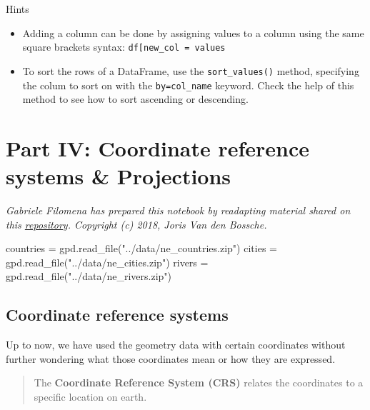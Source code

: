 \documentclass[
  letterpaper,
  DIV=11,
  numbers=noendperiod]{scrreprt}
\newenvironment{Shaded}{\begin{snugshade}}{\end{snugshade}}
\newcommand{\NormalTok}[1]{\textcolor[rgb]{0.00,0.23,0.31}{#1}}
\newcommand{\OperatorTok}[1]{\textcolor[rgb]{0.37,0.37,0.37}{#1}}
\newcommand{\StringTok}[1]{\textcolor[rgb]{0.13,0.47,0.30}{#1}}
\providecommand{\tightlist}{%
  \setlength{\itemsep}{0pt}\setlength{\parskip}{0pt}}\usepackage{longtable,booktabs,array}
\begin{document}
Hints

\begin{itemize}
\tightlist
\item
  Adding a column can be done by assigning values to a column using the
  same square brackets syntax:
  \texttt{df{[}\textquotesingle{}new\_col\textquotesingle{}{]}\ =\ values}
\item
  To sort the rows of a DataFrame, use the \texttt{sort\_values()}
  method, specifying the colum to sort on with the
  \texttt{by=\textquotesingle{}col\_name\textquotesingle{}} keyword.
  Check the help of this method to see how to sort ascending or
  descending.
\end{itemize}

\hypertarget{part-iv-coordinate-reference-systems-projections}{%
\section{Part IV: Coordinate reference systems \&
Projections}\label{part-iv-coordinate-reference-systems-projections}}

\emph{Gabriele Filomena has prepared this notebook by readapting
material shared on this
\href{https://github.com/jorisvandenbossche/geopandas-tutorial}{repository}.
Copyright (c) 2018, Joris Van den Bossche.}

\begin{Shaded}
\begin{Highlighting}[]
\NormalTok{countries }\OperatorTok{=}\NormalTok{ gpd.read\_file(}\StringTok{"../data/ne\_countries.zip"}\NormalTok{)}
\NormalTok{cities }\OperatorTok{=}\NormalTok{ gpd.read\_file(}\StringTok{"../data/ne\_cities.zip"}\NormalTok{)}
\NormalTok{rivers }\OperatorTok{=}\NormalTok{ gpd.read\_file(}\StringTok{"../data/ne\_rivers.zip"}\NormalTok{)}
\end{Highlighting}
\end{Shaded}

\hypertarget{coordinate-reference-systems}{%
\subsection{Coordinate reference
systems}\label{coordinate-reference-systems}}

Up to now, we have used the geometry data with certain coordinates
without further wondering what those coordinates mean or how they are
expressed.

\begin{quote}
The \textbf{Coordinate Reference System (CRS)} relates the coordinates
to a specific location on earth.
\end{quote}
\end{document}

